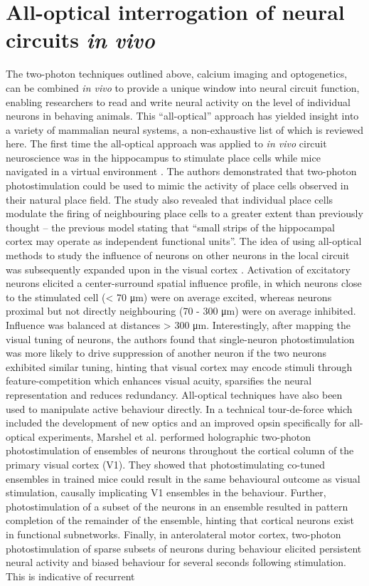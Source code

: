 \section{All-optical interrogation of neural circuits \textit{in vivo}}
 
The two-photon techniques outlined above, calcium imaging and optogenetics, can be combined \textit{in vivo} to provide a unique window into neural circuit function, enabling researchers to read and write neural activity on the level of individual neurons in behaving animals. This “all-optical” approach has yielded insight into a variety of mammalian neural systems, a non-exhaustive list of which is reviewed here. The first time the all-optical approach was applied to \textit{in vivo} circuit neuroscience was in the hippocampus to stimulate place cells while mice navigated in a virtual environment \cite{rickgauer_simultaneous_2014}. The authors demonstrated that two-photon photostimulation could be used to mimic the activity of place cells observed in their natural place field. The study also revealed that individual place cells modulate the firing of neighbouring place cells to a greater extent than previously thought -- the previous model \cite{andersen_lamellar_1971} stating that “small strips of the hippocampal cortex may operate as independent functional units”. The idea of using all-optical methods to study the influence of neurons on other neurons in the local circuit was subsequently expanded upon in the visual cortex \cite{chettih_single-neuron_2019}. Activation of excitatory neurons elicited a center-surround spatial influence profile, in which neurons close to the stimulated cell (< 70 μm) were on average excited, whereas neurons proximal but not directly neighbouring (70 - 300 μm) were on average inhibited. Influence was balanced at distances > 300 μm. Interestingly, after mapping the visual tuning of neurons, the authors found that single-neuron photostimulation was more likely to drive suppression of another neuron if the two neurons exhibited similar tuning, hinting that visual cortex may encode stimuli through feature-competition which enhances visual acuity, sparsifies the neural representation and reduces redundancy. All-optical techniques have also been used to manipulate active behaviour directly. In a technical tour-de-force which included the development of new optics and an improved opsin specifically for all-optical experiments, Marshel et al. \cite{marshel_cortical_2019} performed holographic two-photon photostimulation of ensembles of neurons throughout the cortical column of the primary visual cortex (V1). They showed that photostimulating co-tuned ensembles in trained mice could result in the same behavioural outcome as visual stimulation, causally implicating V1 ensembles in the behaviour. Further, photostimulation of a subset of the neurons in an ensemble resulted in pattern completion of the remainder of the ensemble, hinting that cortical neurons exist in functional subnetworks. Finally, in anterolateral motor cortex, two-photon photostimulation of sparse subsets of neurons during behaviour elicited persistent neural activity and biased behaviour for several seconds following stimulation. This is indicative of recurrent 